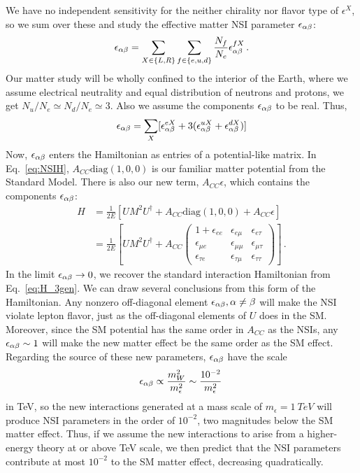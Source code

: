 \documentclass{thesis}
\begin{document}
We have no independent sensitivity for the neither chirality nor flavor type of $\epsilon^X$, so we sum over these and study the effective matter NSI parameter
 $\epsilon_{\alpha\beta}$:
\begin{align}
    \epsilon_{\alpha\beta} = \sum_{X \in \{L,R\}} \sum_{f \in \{e,u,d\}} \frac{N_f}{N_e} \epsilon^{fX}_{\alpha\beta}\,.
\end{align}
Our matter study will be wholly confined to the interior of the Earth, where we assume electrical neutrality and equal distribution of neutrons and protons, 
we get $N_u/N_e \simeq N_d/N_e \simeq 3$. Also we assume the components $\epsilon_{\alpha\beta}$ to be real. Thus,
\begin{align}
    \epsilon_{\alpha\beta} =  \sum_X [\epsilon_{\alpha\beta}^{eX} + 3(\epsilon_{\alpha\beta}^{uX} + \epsilon_{\alpha\beta}^{dX})]
\end{align}
Now, $\epsilon_{\alpha\beta}$ enters the Hamiltonian as entries of a potential-like matrix. In Eq.~\ref{eq:NSIH}, $A_{CC}\text{diag}(1,0,0)$ is our 
familiar matter potential from the Standard Model. There is also our new term, $A_{CC} \epsilon$, which contains the components $\epsilon_{\alpha\beta}$:
\begin{align}\label{eq:NSIH}
    H &= \frac{1}{2E} \left[UM^2U^\dagger + A_{CC}\text{diag}(1,0,0) + A_{CC} \epsilon \right] \nonumber \\
      &= \frac{1}{2E} \left[UM^2U^\dagger + A_{CC}
      \begin{pmatrix}
          1 + \epsilon_{ee} & \epsilon_{e\mu} & \epsilon_{e\tau}  \\
          \epsilon_{\mu e} & \epsilon_{\mu\mu} & \epsilon_{\mu\tau}  \\
          \epsilon_{\tau e} & \epsilon_{\tau\mu} & \epsilon_{\tau\tau}
      \end{pmatrix} \right]\,.
\end{align} 
In the limit $\epsilon_{\alpha\beta} \to 0$, we recover the standard interaction Hamiltonian from Eq.~\ref{eq:H_3gen}.
We can draw several conclusions from this form of the Hamiltonian. Any nonzero off-diagonal element $\epsilon_{\alpha\beta}, \alpha \neq \beta$ will make the NSI violate 
lepton flavor, just as the off-diagonal elements of $U$ does in the SM. Moreover, since the SM potential has the same order in $A_{CC}$ as the NSIs, 
any $\epsilon_{\alpha\beta} \sim 1$ will make the new matter effect be the same order as the SM effect.
Regarding the source of these new parameters, $\epsilon_{\alpha\beta}$ have the scale
\begin{align}
    \epsilon_{\alpha\beta} \propto \frac{m_W^2}{m_{\epsilon}^2} \sim \frac{10^{-2}}{m_\epsilon^2}\,
\end{align} 
in TeV, so the new interactions generated at a mass scale of $m_\epsilon = \SI{1}{TeV}$ will produce NSI parameters in the order of $10^{-2}$, 
two magnitudes below the SM matter effect. Thus, if we assume the new interactions to arise from a higher-energy theory at or above TeV scale, 
we then predict that the NSI parameters contribute at most $10^{-2}$ to the SM matter effect, decreasing quadratically.
\end{document}
